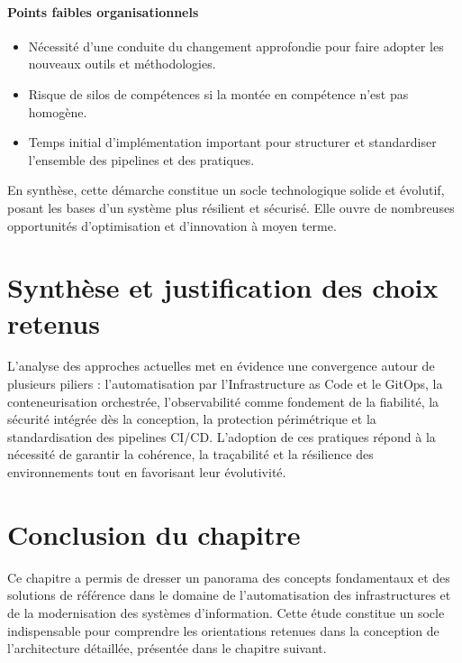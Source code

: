 \paragraph{Points faibles organisationnels}
\begin{itemize}
	\item Nécessité d’une conduite du changement approfondie pour faire adopter les nouveaux outils et méthodologies.
	\item Risque de silos de compétences si la montée en compétence n’est pas homogène.
	\item Temps initial d’implémentation important pour structurer et standardiser l’ensemble des pipelines et des pratiques.
\end{itemize}

En synthèse, cette démarche constitue un socle technologique solide et évolutif, posant les bases d’un système plus résilient et sécurisé. Elle ouvre de nombreuses opportunités d’optimisation et d’innovation à moyen terme.
\section{Synthèse et justification des choix retenus}

L’analyse des approches actuelles met en évidence une convergence autour de plusieurs piliers : l’automatisation par l’Infrastructure as Code et le GitOps, la conteneurisation orchestrée, l’observabilité comme fondement de la fiabilité, la sécurité intégrée dès la conception, la protection périmétrique et la standardisation des pipelines CI/CD. L’adoption de ces pratiques répond à la nécessité de garantir la cohérence, la traçabilité et la résilience des environnements tout en favorisant leur évolutivité.

\section{Conclusion du chapitre}

Ce chapitre a permis de dresser un panorama des concepts fondamentaux et des solutions de référence dans le domaine de l’automatisation des infrastructures et de la modernisation des systèmes d’information. Cette étude constitue un socle indispensable pour comprendre les orientations retenues dans la conception de l’architecture détaillée, présentée dans le chapitre suivant.
